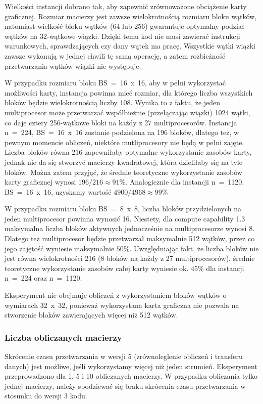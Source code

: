 \documentclass[12pt,a4paper]{article}
\begin{document}
Wielkości instancji dobrano tak, aby zapewnić zrównoważone obciążenie karty graficznej. Rozmiar macierzy jest zawsze wielokrotnością rozmiaru bloku wątków, natomiast wielkość bloku wątków (64 lub 256) gwarantuje optymalny podział wątków na 32-wątkowe wiązki. Dzięki temu kod nie musi zawierać instrukcji warunkowych, sprawdzających czy dany wątek ma pracę. Wszystkie wątki wiązki zawsze wykonują w jednej chwili tę samą operację, a zatem rozbieżność przetwarzania wątków wiązki nie występuje.

W przypadku rozmiaru bloku BS~=~16~x~16, aby w pełni wykorzystać możliwości karty, instancja powinna mieć rozmiar, dla którego liczba wszystkich bloków będzie wielokrotnością liczby 108. Wynika to z faktu, że jeden multiprocesor może przetwarzać współbieżnie (przełączając wiązki) 1024 wątki, co daje cztery 256-wątkowe bloki na każdy z 27 multiprocesorów. Instancja  n~=~224, BS~=~16~x~16 zostanie podzielona na 196 bloków, dlatego też, w pewnym momencie obliczeń, niektóre mutliprocesory nie będą w pełni zajęte. Liczba bloków równa 216 zapewniłaby optymalne wykorzystanie zasobów karty, jednak nie da się stworzyć macierzy kwadratowej, która dzieliłaby się na tyle bloków. Można zatem przyjąć, że średnie teoretyczne wykorzystanie zasobów karty graficznej wynosi $196 / 216 \approx 91\% $. Analogicznie dla instancji  n~=~1120, BS~=~16~x~16, uzyskamy wartość $4900 / 4968 \approx 99\% $

W przypadku rozmiaru bloku  BS~=~8~x~8, liczba bloków przydzielonych na jeden multiprocesor powinna wynosić 16. Niestety, dla compute capability 1.3 maksymalna liczba bloków aktywnych jednocześnie na multiprocesorze wynosi 8. Dlatego też multiprocesor będzie przetwarzał maksymalnie 512 wątków, przez co jego zajętość wyniesie maksymalnie $50\%$.  Uwzględniając fakt, że liczba bloków nie jest równa wielokrotności 216 (8 bloków na każdy z 27 multiprocesorów), średnie teoretyczne wykorzystanie zasobów całej karty wyniesie ok. $45\%$ dla instancji n~=~224 oraz n~=~1120.

Eksperyment nie obejmuje obliczeń z wykorzystaniem bloków wątków o wymiarach 32~x~32, ponieważ wykorzystana karta graficzna nie pozwala na stworzenie bloków zawierających więcej niż 512 wątków.


\subsubsection*{Liczba obliczanych macierzy}

Skrócenie czasu przetwarzania w wersji 5 (zrównoleglenie obliczeń i transferu danych) jest możliwe, jeśli wykorzystamy więcej niż jeden strumień. Eksperyment przeprowadzono dla 1, 5 i 10 obliczanych macierzy. W przypadku obliczania tylko jednej macierzy, należy spodziewać się braku skrócenia czasu przetwarzania w stosunku do wersji 3 kodu.
\end{document}
